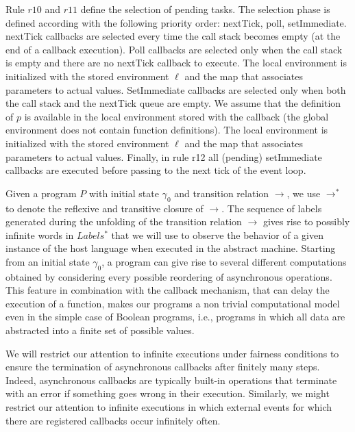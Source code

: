 Rule $r10$ and $r11$ define the selection of pending tasks.
The selection phase is defined according with the following priority order: nextTick, 
poll, setImmediate. nextTick callbacks are selected every time the call stack becomes empty 
(at the end of a callback execution).
Poll callbacks are selected only when the call stack is empty and there are no nextTick callback to execute. 
The local environment is initialized with the stored environment $\ell$ and the map that associates parameters to actual values.  
SetImmediate callbacks are selected only when both the call stack and the nextTick queue are empty. 
We assume that the definition of $p$ is available in the local environment stored with the callback
(the global environment does not contain function definitions).
The local environment is initialized with the stored environment $\ell$ and the map that associates
parameters to actual values. 
Finally, in rule r12 all (pending) setImmediate callbacks are executed before passing to the next tick of 
the event loop.
%

Given a program $P$ with initial state $\gamma_0$ and transition relation $\rightarrow$,  we use $\rightarrow^*$ to denote the reflexive and transitive closure of $\rightarrow$. The sequence of labels generated during the unfolding of the transition relation $\rightarrow$ 
gives rise to possibly infinite words in $Labels^*$ that we will use to observe the behavior of a given instance of the host language when executed in the abstract machine. Starting from an initial state $\gamma_0$, a program can give rise to several different computations obtained by  considering every possible reordering of asynchronous operations. This feature in combination with the callback mechanism, that can delay the execution of a function, makes our programs a non trivial computational model even in the simple case of Boolean programs, i.e., programs in which all data are abstracted into a finite set of possible values. 

We will restrict our attention to infinite executions under fairness conditions to ensure the termination of asynchronous callbacks after finitely many steps. Indeed, asynchronous callbacks are typically built-in operations that terminate with an error if something goes wrong in their execution. Similarly, we might restrict our attention to infinite executions in which  external events for which there are registered callbacks occur infinitely often.